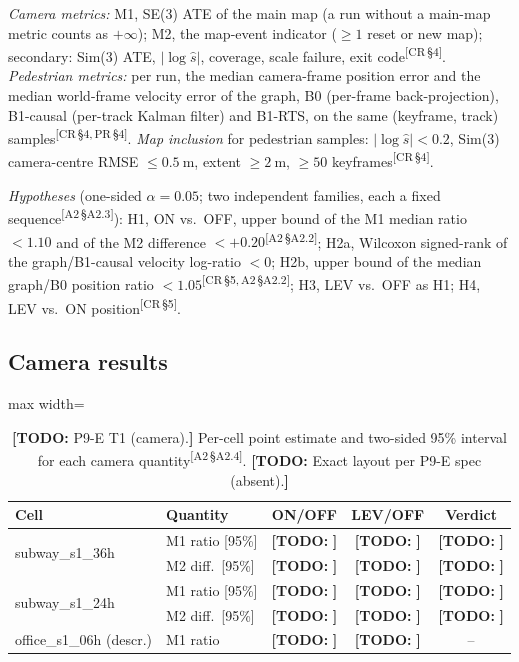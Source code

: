 \documentclass[journal]{IEEEtran}
\newcommand{\TODO}[1]{{\color{red}\textbf{[TODO:} #1\textbf{]}}}
\newcommand{\src}[1]{\textsuperscript{\color{blue}\scriptsize[#1]}}
\begin{document}
\emph{Camera metrics:} M1, SE(3) ATE of the main map (a run without a
main-map metric counts as $+\infty$); M2, the map-event indicator ($\geq 1$
reset or new map); secondary: Sim(3) ATE, $|\log\hat s|$, coverage, scale
failure, exit code\src{CR\,\S4}.
\emph{Pedestrian metrics:} per run, the median camera-frame position error and
the median world-frame velocity error of the graph, B0 (per-frame
back-projection), B1-causal (per-track Kalman filter) and B1-RTS, on the same
(keyframe, track) samples\src{CR\,\S4,\,PR\,\S4}.
\emph{Map inclusion} for pedestrian samples: $|\log\hat s|<0.2$, Sim(3)
camera-centre RMSE $\leq\SI{0.5}{\metre}$, extent $\geq\SI{2}{\metre}$,
$\geq 50$ keyframes\src{CR\,\S4}.

\emph{Hypotheses} (one-sided $\alpha=0.05$; two independent families, each a
fixed sequence\src{A2\,\S A2.3}):
H1, ON vs.\ OFF, upper bound of the M1 median ratio $<1.10$ and of the M2
difference $<+0.20$\src{A2\,\S A2.2};
H2a, Wilcoxon signed-rank of the graph/B1-causal velocity log-ratio $<0$;
H2b, upper bound of the median graph/B0 position ratio $<1.05$\src{CR\,\S5,\,A2\,\S A2.2};
H3, LEV vs.\ OFF as H1; H4, LEV vs.\ ON position\src{CR\,\S5}.

\subsection{Camera results}
\begin{table}[t]
\centering
\caption{\TODO{P9-E T1 (camera).} Per-cell point estimate and two-sided 95\%
interval for each camera quantity\src{A2\,\S A2.4}.
\TODO{Exact layout per P9-E spec (absent).}}
\label{tab:camera}
\begin{adjustbox}{max width=\columnwidth}
\setlength{\tabcolsep}{3pt}\footnotesize
\begin{tabular}{@{}llccc@{}}
\toprule
Cell & Quantity & ON/OFF & LEV/OFF & Verdict \\
\midrule
\multirow{2}{*}{subway\_s1\_36h} & M1 ratio [95\%] & \TODO{} & \TODO{} & \TODO{} \\
                                 & M2 diff.\ [95\%] & \TODO{} & \TODO{} & \TODO{} \\
\multirow{2}{*}{subway\_s1\_24h} & M1 ratio [95\%] & \TODO{} & \TODO{} & \TODO{} \\
                                 & M2 diff.\ [95\%] & \TODO{} & \TODO{} & \TODO{} \\
office\_s1\_06h (descr.)         & M1 ratio        & \TODO{} & \TODO{} & -- \\
\bottomrule
\end{tabular}
\end{adjustbox}
\end{table}
\end{document}
